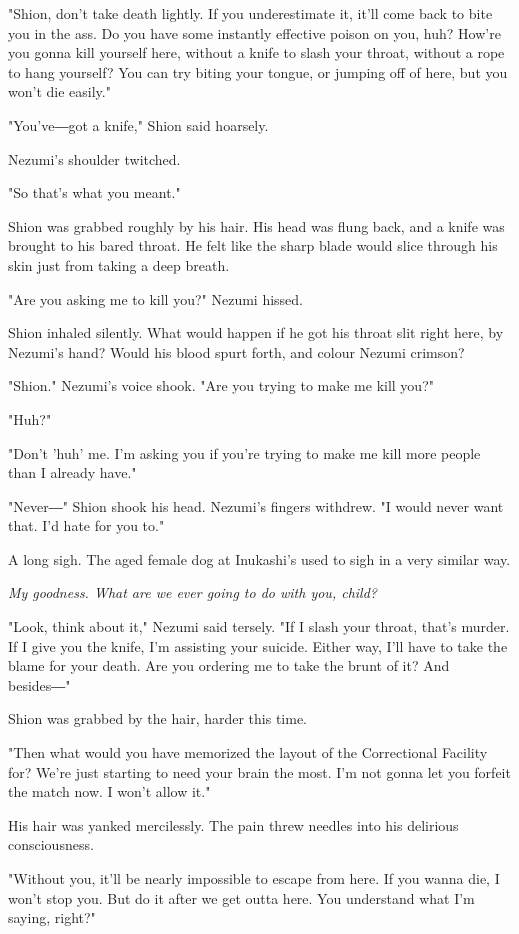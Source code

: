"Shion, don't take death lightly. If you underestimate it, it'll come
back to bite you in the ass. Do you have some instantly effective poison
on you, huh? How're you gonna kill yourself here, without a knife to
slash your throat, without a rope to hang yourself? You can try biting
your tongue, or jumping off of here, but you won't die easily."

"You've―got a knife," Shion said hoarsely.

Nezumi's shoulder twitched.

"So that's what you meant."

Shion was grabbed roughly by his hair. His head was flung back, and a
knife was brought to his bared throat. He felt like the sharp blade
would slice through his skin just from taking a deep breath.

"Are you asking me to kill you?" Nezumi hissed.

Shion inhaled silently. What would happen if he got his throat slit
right here, by Nezumi's hand? Would his blood spurt forth, and colour
Nezumi crimson?

"Shion." Nezumi's voice shook. "Are you trying to make me kill you?"

"Huh?"

"Don't 'huh' me. I'm asking you if you're trying to make me kill more
people than I already have."

"Never―" Shion shook his head. Nezumi's fingers withdrew. "I would never
want that. I'd hate for you to."

A long sigh. The aged female dog at Inukashi's used to sigh in a very
similar way.

\emph{My goodness. What are we ever going to do with you, child?}

"Look, think about it," Nezumi said tersely. "If I slash your throat,
that's murder. If I give you the knife, I'm assisting your suicide.
Either way, I'll have to take the blame for your death. Are you ordering
me to take the brunt of it? And besides―"

Shion was grabbed by the hair, harder this time.

"Then what would you have memorized the layout of the Correctional
Facility for? We're just starting to need your brain the most. I'm not
gonna let you forfeit the match now. I won't allow it."

His hair was yanked mercilessly. The pain threw needles into his
delirious consciousness.

"Without you, it'll be nearly impossible to escape from here. If you
wanna die, I won't stop you. But do it after we get outta here. You
understand what I'm saying, right?"

